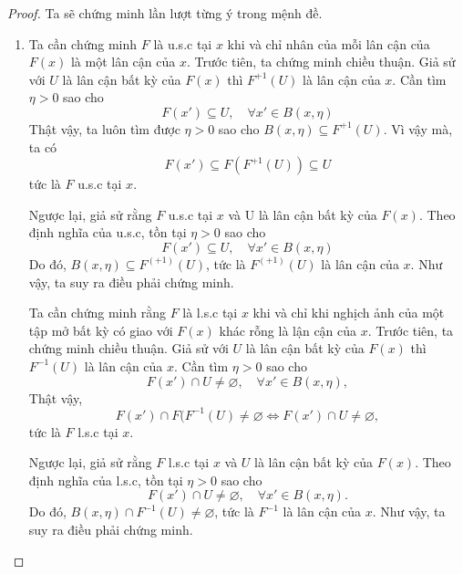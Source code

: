\documentclass{article}
\begin{document}
\begin{proof}
    Ta sẽ chứng minh lần lượt từng ý trong mệnh đề.
    \begin{enumerate}[label=(\roman*)]
        \item Ta cần chứng minh $F$ là u.s.c tại $x$ khi và chỉ nhân của mỗi lân cận của $F(x)$ là một lân cận của $x$. Trước tiên, ta chứng minh chiều thuận. Giả sử với $U$ là lân cận bất kỳ của $F(x)$ thì $F^{+1}(U)$ là lân cận của $x$. Cần tìm $\eta > 0$ sao cho
        \begin{equation}
            F(x') \subseteq U, \quad\forall x' \in B(x, \eta)
        \end{equation}
        Thật vậy, ta luôn tìm được $\eta > 0$ sao cho $B(x, \eta) \subseteq F^{+1}(U)$.
        Vì vậy mà, ta có
        \begin{equation}
            F(x') \subseteq F(F^{+1}(U)) \subseteq U
        \end{equation}
        tức là $F$ u.s.c tại $x$.

        Ngược lại, giả sử rằng $F$ u.s.c tại $x$ và U là lân cận bất kỳ của $F(x)$. Theo định nghĩa của u.s.c, tồn tại $\eta > 0$ sao cho
        \begin{equation}
            F(x') \subseteq U,\quad \forall x' \in B(x, \eta)
        \end{equation}
        Do đó, $B(x, \eta) \subseteq F^{(+1)}(U)$, tức là $F^{(+1)}(U)$ là lân cận của $x$. Như vậy, ta suy ra điều phải chứng minh.

        Ta cần chứng minh rằng $F$ là l.s.c tại $x$ khi và chỉ khi nghịch ảnh của một tập mở bất kỳ có giao với $F(x)$ khác rỗng là lận cận của $x$. Trước tiên, ta chứng minh chiều thuận. Giả sử với $U$ là lân cận bất kỳ của $F(x)$ thì $F^{-1}(U)$ là lân cận của $x$. Cần tìm $\eta > 0$ sao cho 
        \begin{equation}
            F(x') \cap U \ne \varnothing, \quad\forall x' \in B(x, \eta),
        \end{equation}
        Thật vậy,
        \begin{equation}
            F(x') \cap F(F^{-1}(U) \ne \varnothing \Leftrightarrow F(x') \cap U \ne \varnothing,
        \end{equation}
        tức là $F$ l.s.c tại $x$.

        Ngược lại, giả sử rằng $F$ l.s.c tại $x$ và $U$ là lân cận bất kỳ của $F(x)$. Theo định nghĩa của l.s.c, tồn tại $\eta > 0$ sao cho
        \begin{equation}
            F(x') \cap U \ne \varnothing,\quad \forall x' \in B(x, \eta).
        \end{equation}
        Do đó, $B(x, \eta) \cap F^{-1}(U) \ne \varnothing$, tức là $F^{-1}$ là lân cận của $x$. Như vậy, ta suy ra điều phải chứng minh.


\end{enumerate}
\end{proof}
\end{document}
